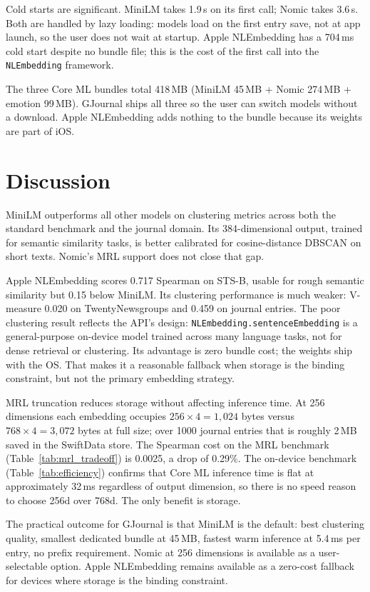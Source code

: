 Cold starts are significant. MiniLM takes 1.9\,s on its first call; Nomic takes 3.6\,s. Both are handled by lazy loading: models load on the first entry save, not at app launch, so the user does not wait at startup. Apple NLEmbedding has a 704\,ms cold start despite no bundle file; this is the cost of the first call into the \texttt{NLEmbedding} framework.

The three Core ML bundles total 418\,MB (MiniLM 45\,MB + Nomic 274\,MB + emotion 99\,MB). GJournal ships all three so the user can switch models without a download. Apple NLEmbedding adds nothing to the bundle because its weights are part of iOS.

\section{Discussion}

MiniLM outperforms all other models on clustering metrics across both the standard benchmark and the journal domain. Its 384-dimensional output, trained for semantic similarity tasks, is better calibrated for cosine-distance DBSCAN on short texts. Nomic's MRL support does not close that gap.

Apple NLEmbedding scores 0.717 Spearman on STS-B, usable for rough semantic similarity but 0.15 below MiniLM. Its clustering performance is much weaker: V-measure 0.020 on TwentyNewsgroups and 0.459 on journal entries. The poor clustering result reflects the API's design: \texttt{NLEmbedding.sentenceEmbedding} is a general-purpose on-device model trained across many language tasks, not for dense retrieval or clustering. Its advantage is zero bundle cost; the weights ship with the OS. That makes it a reasonable fallback when storage is the binding constraint, but not the primary embedding strategy.

MRL truncation reduces storage without affecting inference time. At 256 dimensions each embedding occupies $256 \times 4 = 1{,}024$ bytes versus $768 \times 4 = 3{,}072$ bytes at full size; over 1000 journal entries that is roughly 2\,MB saved in the SwiftData store. The Spearman cost on the MRL benchmark (Table~\ref{tab:mrl_tradeoff}) is 0.0025, a drop of 0.29\%. The on-device benchmark (Table~\ref{tab:efficiency}) confirms that Core ML inference time is flat at approximately 32\,ms regardless of output dimension, so there is no speed reason to choose 256d over 768d. The only benefit is storage.

The practical outcome for GJournal is that MiniLM is the default: best clustering quality, smallest dedicated bundle at 45\,MB, fastest warm inference at 5.4\,ms per entry, no prefix requirement. Nomic at 256 dimensions is available as a user-selectable option. Apple NLEmbedding remains available as a zero-cost fallback for devices where storage is the binding constraint.
